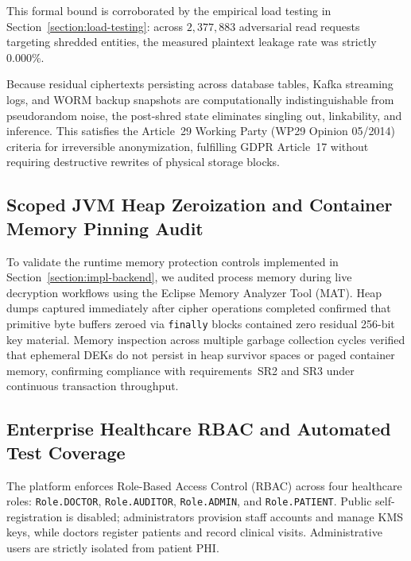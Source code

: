 This formal bound is corroborated by the empirical load testing in Section~\ref{section:load-testing}: across $2{,}377{,}883$ adversarial read requests targeting shredded entities, the measured plaintext leakage rate was strictly $0.000\%$.

Because residual ciphertexts persisting across database tables, Kafka streaming logs, and WORM backup snapshots are computationally indistinguishable from pseudorandom noise, the post-shred state eliminates singling out, linkability, and inference. This satisfies the Article~29 Working Party (WP29 Opinion 05/2014) criteria for irreversible anonymization, fulfilling GDPR Article~17 without requiring destructive rewrites of physical storage blocks.

\subsection{Scoped JVM Heap Zeroization and Container Memory Pinning Audit}

To validate the runtime memory protection controls implemented in Section~\ref{section:impl-backend}, we audited process memory during live decryption workflows using the Eclipse Memory Analyzer Tool (MAT). Heap dumps captured immediately after cipher operations completed confirmed that primitive byte buffers zeroed via \texttt{finally} blocks contained zero residual 256-bit key material. Memory inspection across multiple garbage collection cycles verified that ephemeral DEKs do not persist in heap survivor spaces or paged container memory, confirming compliance with requirements~SR2 and SR3 under continuous transaction throughput.

\subsection{Enterprise Healthcare RBAC and Automated Test Coverage}

The platform enforces Role-Based Access Control (RBAC) across four healthcare roles: \texttt{Role.DOCTOR}, \texttt{Role.AUDITOR}, \texttt{Role.ADMIN}, and \texttt{Role.PATIENT}. Public self-registration is disabled; administrators provision staff accounts and manage KMS keys, while doctors register patients and record clinical visits. Administrative users are strictly isolated from patient PHI.

